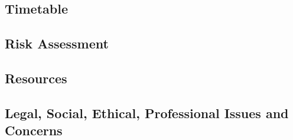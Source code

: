 \subsection{Timetable}
\subsection{Risk Assessment}
\subsection{Resources}
\subsection{Legal, Social, Ethical, Professional Issues and Concerns}